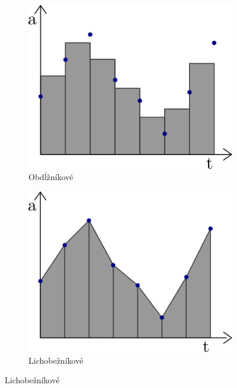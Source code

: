 \begin{figure}[h]
\centering
\begin{subfigure}[b]{0.32\textwidth}
    \centering
    \includegraphics[width=\textwidth]{figures/rectangular-rule.png}
    \caption{Obdĺžníkové}
    \label{fig:midpoint-rule}
\end{subfigure}
\hfill
\begin{subfigure}[b]{0.32\textwidth}
    \centering
    \includegraphics[width=\textwidth]{figures/trapezoidal-rule.png}
    \caption{Lichobežníkové}
    \label{fig:trapezodial-rule}
\end{subfigure}
\hfill

\end{figure}
